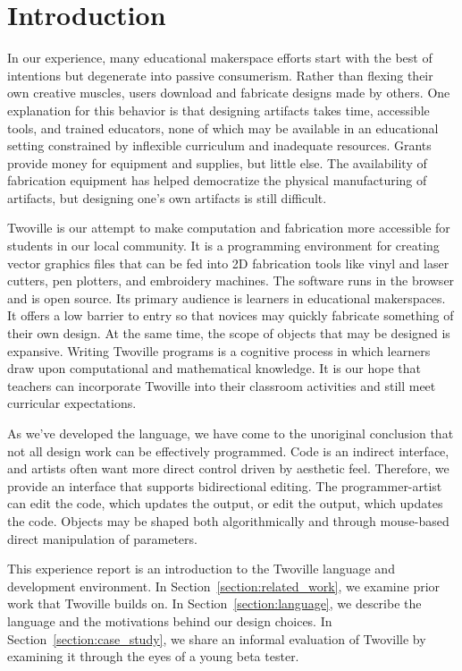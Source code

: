 \section{Introduction}
\label{section:introduction}


In our experience, many educational makerspace efforts start with the best of intentions but degenerate into passive consumerism. Rather than flexing their own creative muscles, users download and fabricate designs made by others. One explanation for this behavior is that designing artifacts takes time, accessible tools, and trained educators, none of which may be available in an educational setting constrained by inflexible curriculum and inadequate resources. Grants provide money for equipment and supplies, but little else. The availability of fabrication equipment has helped democratize the physical manufacturing of artifacts, but designing one's own artifacts is still difficult.

Twoville is our attempt to make computation and fabrication more accessible for students in our local community. It is a programming environment for creating vector graphics files that can be fed into 2D fabrication tools like vinyl and laser cutters, pen plotters, and embroidery machines. The software runs in the browser and is open source. Its primary audience is learners in educational makerspaces. It offers a low barrier to entry so that novices may quickly fabricate something of their own design. At the same time, the scope of objects that may be designed is expansive. Writing Twoville programs is a cognitive process in which learners draw upon computational and mathematical knowledge. It is our hope that teachers can incorporate Twoville into their classroom activities and still meet curricular expectations.

As we've developed the language, we have come to the unoriginal conclusion that not all design work can be effectively programmed. Code is an indirect interface, and artists often want more direct control driven by aesthetic feel. Therefore, we provide an interface that supports bidirectional editing. The programmer-artist can edit the code, which updates the output, or edit the output, which updates the code. Objects may be shaped both algorithmically and through mouse-based direct manipulation of parameters.

This experience report is an introduction to the Twoville language and development environment. In Section~\ref{section:related_work}, we examine prior work that Twoville builds on. In Section~\ref{section:language}, we describe the language and the motivations behind our design choices. In Section~\ref{section:case_study}, we share an informal evaluation of Twoville by examining it through the eyes of a young beta tester.

